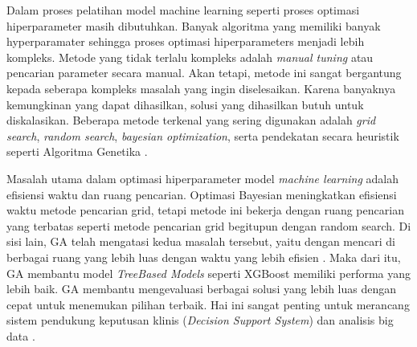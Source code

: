     Dalam proses pelatihan model machine learning seperti proses optimasi hiperparameter  masih dibutuhkan. Banyak algoritma yang memiliki banyak hyperparamater sehingga proses optimasi hiperparameters menjadi lebih kompleks. Metode yang tidak terlalu kompleks adalah \textit{manual tuning} atau pencarian parameter secara manual. Akan tetapi, metode ini sangat bergantung kepada seberapa kompleks masalah yang ingin diselesaikan. Karena banyaknya kemungkinan yang dapat dihasilkan, solusi yang dihasilkan butuh untuk diskalasikan. Beberapa metode terkenal yang sering digunakan adalah \textit{grid search}, \textit{random search}, \textit{bayesian optimization}, serta pendekatan secara heuristik seperti Algoritma Genetika \cite{10.1145/3297067.3297080}.

    Masalah utama dalam optimasi hiperparameter model \textit{machine learning} adalah efisiensi waktu dan ruang pencarian. Optimasi Bayesian meningkatkan efisiensi waktu metode pencarian grid, tetapi metode ini bekerja dengan ruang pencarian yang terbatas seperti metode pencarian grid begitupun dengan random search. Di sisi lain, GA telah mengatasi kedua masalah tersebut, yaitu dengan mencari di berbagai ruang yang lebih luas dengan waktu yang lebih efisien \cite{Katoch2021}. Maka dari itu, GA membantu model \textit{TreeBased Models} seperti XGBoost memiliki performa yang lebih baik. GA membantu mengevaluasi berbagai solusi yang lebih luas dengan cepat untuk menemukan pilihan terbaik. Hai ini sangat penting untuk merancang sistem pendukung keputusan klinis (\textit{Decision Support System}) dan analisis big data \cite{https://doi.org/10.1155/2023/9673395}.
    

    
